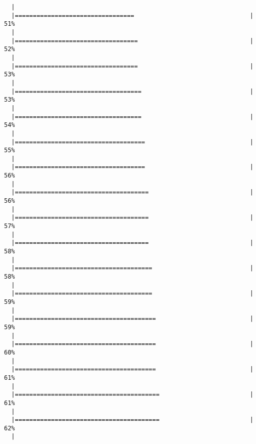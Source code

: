 \begin{knitrout}
\begin{kframe}
\begin{verbatim}
  |                                                                       
  |=================================                                |  51%
  |                                                                       
  |==================================                               |  52%
  |                                                                       
  |==================================                               |  53%
  |                                                                       
  |===================================                              |  53%
  |                                                                       
  |===================================                              |  54%
  |                                                                       
  |====================================                             |  55%
  |                                                                       
  |====================================                             |  56%
  |                                                                       
  |=====================================                            |  56%
  |                                                                       
  |=====================================                            |  57%
  |                                                                       
  |=====================================                            |  58%
  |                                                                       
  |======================================                           |  58%
  |                                                                       
  |======================================                           |  59%
  |                                                                       
  |=======================================                          |  59%
  |                                                                       
  |=======================================                          |  60%
  |                                                                       
  |=======================================                          |  61%
  |                                                                       
  |========================================                         |  61%
  |                                                                       
  |========================================                         |  62%
  |                                                                       

\end{verbatim}
\end{kframe}
\end{knitrout}
